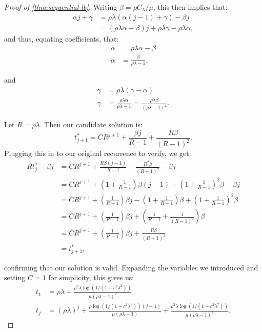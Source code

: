 \documentclass{article}
\begin{document}
\begin{proof}[Proof of \cref{thm:sequential-lb}]
Writing $\beta = \rho C_\lambda/\mu$, this then implies that:
\begin{align*}
    \alpha j + \gamma &= \rho\lambda(\alpha(j-1)+\gamma) - \beta j \\
    &= (\rho\lambda\alpha-\beta)j + \rho\lambda\gamma - \rho\lambda\alpha,
\end{align*}
and thus, equating coefficients, that:
\begin{align*}
    \alpha &= \rho\lambda\alpha-\beta \\
    \alpha &= \frac{\beta}{\rho\lambda-1},
\end{align*}

and
\begin{align*}
    \gamma &= \rho\lambda(\gamma-\alpha) \\
    \gamma &= \frac{\rho\lambda\alpha}{\rho\lambda-1} = \frac{\rho\lambda\beta}{(\rho\lambda-1)^2}.
\end{align*}

Let $R = \rho\lambda$. Then our candidate solution is:
\begin{equation*}
    t^*_{j+1}=CR^{j+1} + \frac{\beta j}{R-1} + \frac{R\beta}{(R-1)^2}.
\end{equation*}
Plugging this in to our original recurrence to verify, we get:
\begin{align*}
    Rt^*_j - \beta j
    &= CR^{j+1} + \frac{R\beta(j-1)}{R-1} + \frac{R^2\beta}{(R-1)^2} - \beta j \\
    &= CR^{j+1} + \left(1 + \frac{1}{R-1} \right)\beta(j-1) + \left(1 + \frac{1}{R-1} \right)^2\beta - \beta j \\
    &= CR^{j+1} + \left(\frac{1}{R-1} \right)\beta j - \left(1+\frac{1}{R-1} \right)\beta  + \left(1 + \frac{1}{R-1} \right)^2\beta \\
    &= CR^{j+1} + \left(\frac{1}{R-1} \right)\beta j + \left(\frac{1}{R-1} + \frac{1}{(R-1)^2} \right)\beta \\
    &= CR^{j+1} + \left(\frac{1}{R-1} \right)\beta j + \frac{R\beta }{(R-1)^2} \\
    &= t^*_{j+1},
\end{align*}

confirming that our solution is valid. Expanding the variables we introduced and setting $C=1$ for simplicity, this gives us:
\begin{align*}
    t_1 &= \rho\lambda + \frac{\rho^2\lambda \log(1/(1-c^2\lambda^2))}{\mu (\rho\lambda-1)^2} \\
    t_j &= (\rho\lambda)^j + \frac{\rho \log(1/(1-c^2\lambda^2)) (j-1)}{\mu(\rho\lambda-1)} + \frac{\rho^2\lambda \log(1/(1-c^2\lambda^2))}{\mu(\rho\lambda-1)^2}.
\end{align*}


\end{proof}
\end{document}
